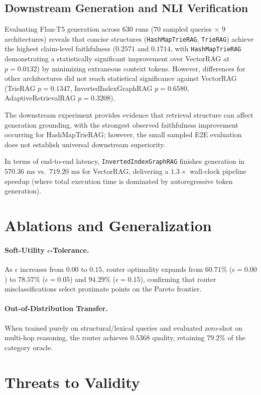 \documentclass[10pt,twocolumn,letterpaper]{article}
\begin{document}
\subsection{Downstream Generation and NLI Verification}
Evaluating Flan-T5 generation across 630 runs ($70$ sampled queries $\times$ $9$ architectures) reveals that concise structures (\texttt{HashMapTrieRAG}, \texttt{TrieRAG}) achieve the highest claim-level faithfulness ($0.2571$ and $0.1714$, with \texttt{HashMapTrieRAG} demonstrating a statistically significant improvement over VectorRAG at $p=0.0132$) by minimizing extraneous context tokens. However, differences for other architectures did not reach statistical significance against VectorRAG (TrieRAG $p=0.1347$, InvertedIndexGraphRAG $p=0.6580$, AdaptiveRetrievalRAG $p=0.3208$).

The downstream experiment provides evidence that retrieval structure can affect generation grounding, with the strongest observed faithfulness improvement occurring for HashMapTrieRAG; however, the small sampled E2E evaluation does not establish universal downstream superiority.

In terms of end-to-end latency, \texttt{InvertedIndexGraphRAG} finishes generation in $570.36\text{ ms}$ vs.~$719.20\text{ ms}$ for VectorRAG, delivering a $\mathbf{1.3\times}$ wall-clock pipeline speedup (where total execution time is dominated by autoregressive token generation).

\section{Ablations and Generalization}
\paragraph{Soft-Utility $\epsilon$-Tolerance.} As $\epsilon$ increases from $0.00$ to $0.15$, router optimality expands from $60.71\%$ ($\epsilon=0.00$) to $78.57\%$ ($\epsilon=0.05$) and $94.29\%$ ($\epsilon=0.15$), confirming that router misclassifications select proximate points on the Pareto frontier.
\paragraph{Out-of-Distribution Transfer.} When trained purely on structural/lexical queries and evaluated zero-shot on multi-hop reasoning, the router achieves $0.5368$ quality, retaining $79.2\%$ of the category oracle.

\section{Threats to Validity}
\end{document}
